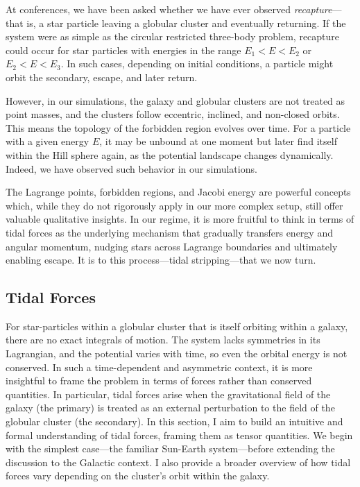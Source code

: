         At conferences, we have been asked whether we have ever observed \textit{recapture}—that is, a star particle leaving a globular cluster and eventually returning. If the system were as simple as the circular restricted three-body problem, recapture could occur for star particles with energies in the range \( E_1 < E < E_2 \) or \( E_2 < E < E_3 \). In such cases, depending on initial conditions, a particle might orbit the secondary, escape, and later return.

        However, in our simulations, the galaxy and globular clusters are not treated as point masses, and the clusters follow eccentric, inclined, and non-closed orbits. This means the topology of the forbidden region evolves over time. For a particle with a given energy \( E \), it may be unbound at one moment but later find itself within the Hill sphere again, as the potential landscape changes dynamically. Indeed, we have observed such behavior in our simulations.

        The Lagrange points, forbidden regions, and Jacobi energy are powerful concepts which, while they do not rigorously apply in our more complex setup, still offer valuable qualitative insights. In our regime, it is more fruitful to think in terms of tidal forces as the underlying mechanism that gradually transfers energy and angular momentum, nudging stars across Lagrange boundaries and ultimately enabling escape. It is to this process—tidal stripping—that we now turn.


    \subsection{Tidal Forces}\label{sec:tidalForce}
        For star-particles within a globular cluster that is itself orbiting within a galaxy, there are no exact integrals of motion. The system lacks symmetries in its Lagrangian, and the potential varies with time, so even the orbital energy is not conserved. In such a time-dependent and asymmetric context, it is more insightful to frame the problem in terms of forces rather than conserved quantities. In particular, tidal forces arise when the gravitational field of the galaxy (the primary) is treated as an external perturbation to the field of the globular cluster (the secondary). In this section, I aim to build an intuitive and formal understanding of tidal forces, framing them as tensor quantities. We begin with the simplest case—the familiar Sun-Earth system—before extending the discussion to the Galactic context. I also provide a broader overview of how tidal forces vary depending on the cluster's orbit within the galaxy.

